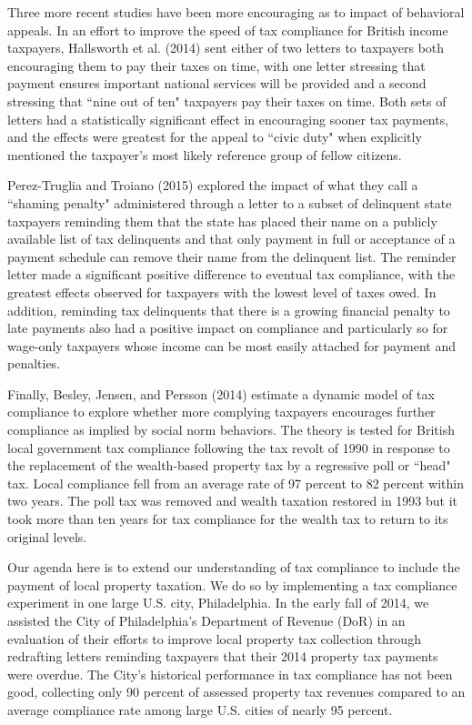 \documentclass[12pt,titlepage]{article}
\begin{document}
Three more recent studies have been more encouraging as to impact of
behavioral appeals. In an effort to improve the speed of tax
compliance for British income taxpayers, Hallsworth et al. (2014)
sent either of two letters to taxpayers both encouraging them to pay
their taxes on time, with one letter stressing that payment ensures
important national services will be provided and a second stressing
that ``nine out of ten" taxpayers pay their taxes on time.  Both sets
of letters had a statistically significant effect in encouraging
sooner tax payments, and the effects were greatest for the appeal to
``civic duty" when explicitly mentioned the taxpayer's most likely
reference group of fellow citizens.

Perez-Truglia and Troiano (2015) explored the impact of what they call
a ``shaming penalty" administered through a letter to a subset of
delinquent state taxpayers reminding them that the state has placed
their name on a publicly available list of tax delinquents and that
only payment in full or acceptance of a payment schedule can remove
their name from the delinquent list.  The reminder letter made a
significant positive difference to eventual tax compliance, with the
greatest effects observed for taxpayers with the lowest level of taxes
owed.  In addition, reminding tax delinquents that there is a growing
financial penalty to late payments also had a positive impact on
compliance and particularly so for wage-only taxpayers whose income
can be most easily attached for payment and penalties.

Finally, Besley, Jensen, and Persson (2014) estimate a dynamic model
of tax compliance to explore whether more complying taxpayers
encourages further compliance as implied by social norm behaviors.
The theory is tested for British local government tax compliance
following the tax revolt of 1990 in response to the replacement of the
wealth-based property tax by a regressive poll or ``head" tax.  Local
compliance fell from an average rate of 97 percent to 82 percent
within two years.  The poll tax was removed and wealth taxation
restored in 1993 but it took more than ten years for tax compliance
for the wealth tax to return to its original levels.

Our agenda here is to extend our understanding of tax compliance to
include the payment of local property taxation.  We do so by
implementing a tax compliance experiment in one large U.S. city,
Philadelphia.  In the early fall of 2014, we assisted the City of
Philadelphia's Department of Revenue (DoR) in an evaluation
of their efforts to improve local property tax collection through
redrafting letters reminding taxpayers that their 2014 property tax
payments were overdue.  The City's historical performance in tax
compliance has not been good, collecting only 90 percent of assessed
property tax revenues compared to an average compliance rate among
large U.S. cities of nearly 95 percent.
\end{document}
